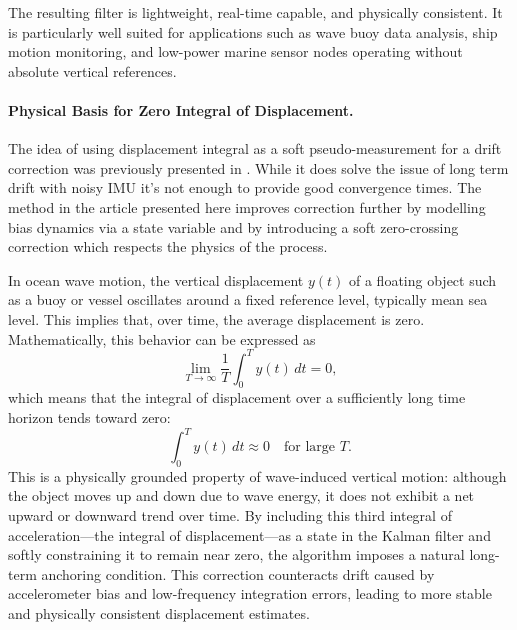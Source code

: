 \documentclass[11pt,letterpaper]{article}
\begin{document}
The resulting filter is lightweight, real-time capable, and physically consistent. It is particularly well suited for applications such as wave buoy data analysis, ship motion monitoring, and low-power marine sensor nodes operating without absolute vertical references.

\paragraph{Physical Basis for Zero Integral of Displacement.}
The idea of using displacement integral as a soft pseudo-measurement for a drift correction was previously presented in \cite{Sharkh2014}. While it does solve the issue of long term drift with noisy IMU it's not enough to provide good convergence times. The method in the article presented here improves correction further by modelling bias dynamics via a state variable and by introducing
a soft zero-crossing correction which respects the physics of the process.

In ocean wave motion, the vertical displacement \( y(t) \) of a floating object such as a buoy or vessel oscillates around a fixed reference level, typically mean sea level. This implies that, over time, the average displacement is zero. Mathematically, this behavior can be expressed as
\begin{equation}
\lim_{T \to \infty} \frac{1}{T} \int_0^T y(t) \, dt = 0,
\end{equation}
which means that the integral of displacement over a sufficiently long time horizon tends toward zero:
\begin{equation}
\int_0^T y(t) \, dt \approx 0 \quad \text{for large } T.
\end{equation}
This is a physically grounded property of wave-induced vertical motion: although the object moves up and down due to wave energy, it does not exhibit a net upward or downward trend over time. By including this third integral of acceleration---the integral of displacement---as a state in the Kalman filter and softly constraining it to remain near zero, the algorithm imposes a natural long-term anchoring condition. This correction counteracts drift caused by accelerometer bias and low-frequency integration errors, leading to more stable and physically consistent displacement estimates.
\end{document}
